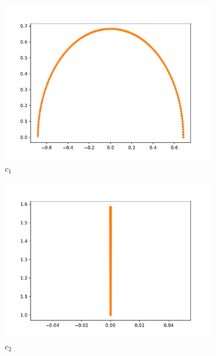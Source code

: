 \begin{figure}[t]\label{fig:curve_2}
    \begin{subfigure}[b]{0.5\textwidth}\label{fig:curve_2_c_1}
        \centering
        \includegraphics[width=\linewidth]{figures/curve_2/curve_c_1.pdf}
        \caption{\(c_1\)}
    \end{subfigure}
    \begin{subfigure}[b]{0.5\textwidth}\label{fig:curve_2_c_2}
        \centering
        \includegraphics[width=\linewidth]{figures/curve_2/curve_c_2.pdf}
        \caption{\(c_2\)}
    \end{subfigure}
    \begin{subfigure}[t]{0.5\textwidth}\label{fig:curve_2_q}

\end{subfigure}
\end{figure}
